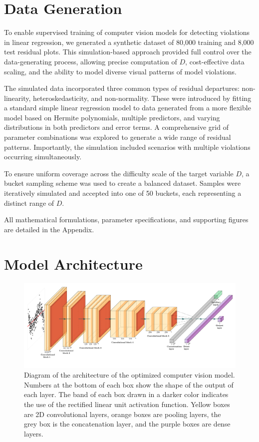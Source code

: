 \documentclass[]{interact}
\theoremstyle{plain}%
\theoremstyle{definition}
\theoremstyle{remark}
\begin{document}
\section{Data Generation}\label{sec-model-data-generation}

To enable supervised training of computer vision models for detecting
violations in linear regression, we generated a synthetic dataset of
80,000 training and 8,000 test residual plots. This simulation-based
approach provided full control over the data-generating process,
allowing precise computation of \(D\), cost-effective data scaling, and
the ability to model diverse visual patterns of model violations.

The simulated data incorporated three common types of residual
departures: non-linearity, heteroskedasticity, and non-normality. These
were introduced by fitting a standard simple linear regression model to
data generated from a more flexible model based on Hermite polynomials,
multiple predictors, and varying distributions in both predictors and
error terms. A comprehensive grid of parameter combinations was explored
to generate a wide range of residual patterns. Importantly, the
simulation included scenarios with multiple violations occurring
simultaneously.

To ensure uniform coverage across the difficulty scale of the target
variable \(D\), a bucket sampling scheme was used to create a balanced
dataset. Samples were iteratively simulated and accepted into one of 50
buckets, each representing a distinct range of \(D\).

All mathematical formulations, parameter specifications, and supporting
figures are detailed in the Appendix.

\section{Model Architecture}\label{sec-model-architecture}

\begin{figure}

{\centering \includegraphics[width=1\linewidth]{paper_files/figure-latex/cnn-diag-1} 

}

\caption{Diagram of the architecture of the optimized computer vision model. Numbers at the bottom of each box show the shape of the output of each layer. The band of each box drawn in a darker color indicates the use of the rectified linear unit activation function.  Yellow boxes are 2D convolutional layers, orange boxes are pooling layers, the grey box is the concatenation layer, and the purple boxes are dense layers.}\label{fig:cnn-diag}
\end{figure}
\end{document}
